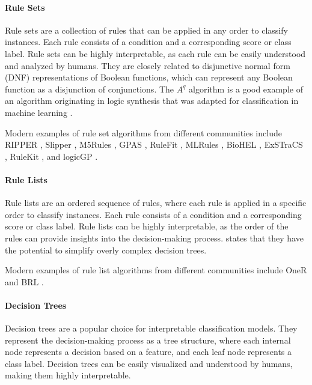\documentclass[a4paper,twoside]{article}
\begin{document}
\paragraph{Rule Sets}

Rule sets are a collection of rules that can be applied in any order to classify instances. Each rule consists of a condition and a corresponding score or class label. Rule sets can be highly interpretable, as each rule can be easily understood and analyzed by humans. They are closely related to disjunctive normal form (DNF) representations of Boolean functions, which can represent any Boolean function as a disjunction of conjunctions. The $A^q$ algorithm \citep{1571135649817801472} is a good example of an algorithm originating in logic synthesis that was adapted for classification in machine learning \citep{michalski1973aqval}.  

Modern examples of rule set algorithms from different communities include RIPPER \citep{10.5555/3091622.3091637}, Slipper \citep{10.5555/315149.315320}, M5Rules \citep{10.1007/3-540-46695-9_1}, GPAS \citep{10.1093/bioinformatics/btm522}, RuleFit \citep{friedman_predictive_2008}, MLRules \citep{10.1145/1390156.1390185}, BioHEL \citep{bacardit_improving_2009}, ExSTraCS \citep{urbanowicz_exstracs_2015}, RuleKit \citep{gudys_rulekit_2020}, and logicGP \citep{10.1145/3712255.3734300}.

\paragraph{Rule Lists}

Rule lists are an ordered sequence of rules, where each rule is applied in a specific order to classify instances. Each rule consists of a condition and a corresponding score or class label. Rule lists can be highly interpretable, as the order of the rules can provide insights into the decision-making process. \citet{QUINLAN1987221} states that they have the potential to simplify overly complex decision trees.

Modern examples of rule list algorithms from different communities include  OneR \citep{holte_very_1993} and BRL \citep{letham_interpretable_2015}.

\paragraph{Decision Trees}

Decision trees are a popular choice for interpretable classification models. They represent the decision-making process as a tree structure, where each internal node represents a decision based on a feature, and each leaf node represents a class label. Decision trees can be easily visualized and understood by humans, making them highly interpretable. 
\end{document}

